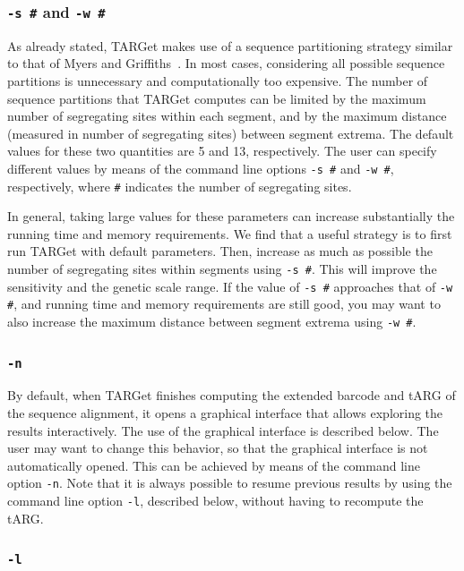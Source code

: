 \documentclass[12pt]{article}
\begin{document}
\subsubsection*{\texttt{-s \#} and \texttt{-w \#}}

As already stated, TARGet makes use of a sequence partitioning strategy similar to that of Myers and Griffiths~\cite{mg}. In most cases, considering all possible sequence partitions is  unnecessary and computationally too expensive. The number of sequence partitions that TARGet computes can be limited by the maximum number of segregating sites within each segment, and by the maximum distance (measured in number of segregating sites) between segment extrema. The default values for these two quantities are 5 and 13, respectively. The user can specify different values by means of the command line options \texttt{-s \#} and \texttt{-w \#}, respectively, where \texttt{\#} indicates the number of segregating sites.

In general, taking large values for these parameters can increase substantially the running time and memory requirements. We find that a useful strategy is to first run TARGet with default parameters. Then, increase as much as possible the number of segregating sites within segments using \texttt{-s \#}. This will improve the sensitivity and the genetic scale range. If the value of \texttt{-s \#} approaches that of \texttt{-w \#}, and running time and memory requirements are still good, you may want to also increase the maximum distance between segment extrema using \texttt{-w \#}.

\subsubsection*{\texttt{-n}}

By default, when TARGet finishes computing the extended barcode and tARG of the sequence alignment, it opens a graphical interface that allows exploring the results interactively. The use of the graphical interface is described below. The user may want to change this behavior, so that the graphical interface is not automatically opened. This can be achieved by means of the command line option \texttt{-n}. Note that it is always possible to resume previous results by using the command line option \texttt{-l}, described below, without having to recompute the tARG.

\subsubsection*{\texttt{-l}}
\end{document}

